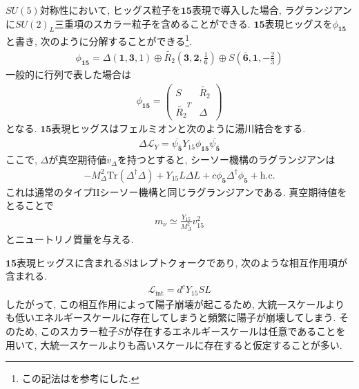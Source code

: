 $SU(5)$対称性において, ヒッグス粒子を$\bm{15}$表現で導入した場合, ラグランジアンに$SU(2)_L$三重項のスカラー粒子を含めることができる\cite{dorsner_phenomenological_2006,dorsner_unification_2005}.
$\bm{15}$表現ヒッグスを$\phi_{\bm{15}}$と書き, 次のように分解することができる\footnote{この記法は\cite{dorsnerPhysicsLeptoquarksPrecision2016}を参考にした.}.
\begin{align}
  \phi_{\bm{15}} = \Delta \left(\bm{1}, \bm{3}, 1\right) \oplus \widetilde{R_2}\left(\bm{3}, \bm{2},\frac{1}{6}\right)\oplus S\left(\overline{\bm{6}}, \bm{1}, -\frac{2}{3}\right)
\end{align}
一般的に行列で表した場合は
\begin{align}
  \phi_{\bm{15}} = \begin{pmatrix}
    S & {\widetilde{R_2}} \\
    \widetilde{R_2}^T & \Delta
  \end{pmatrix}
\end{align}
となる.
$\bm{15}$表現ヒッグスはフェルミオンと次のように湯川結合をする.
\begin{align}
  \Delta\mathcal{L}_Y = \overline{\psi_{\bm{\bar{5}}}} Y_{15} \phi_{\bm{15}}\overline{\psi_{\bm{\bar{5}}}} 
\end{align}
ここで, $\Delta$が真空期待値$v_\Delta$を持つとすると, シーソー機構のラグランジアンは
\begin{align}
  -M_\Delta^2 \mathrm{Tr}(\Delta^\dagger \Delta) + Y_{15} L\Delta L +c \phi_{\bm{5}}\Delta^\dagger \phi_{\bm{5}} +\mathrm{h.c.}\nonumber
\end{align}
これは通常のタイプIIシーソー機構と同じラグランジアンである.
真空期待値をとることで
\begin{align}
  m_\nu \simeq \frac{Y_{15}}{M_\Delta^2}v_{15}^2\nonumber
\end{align}
とニュートリノ質量を与える.

$\bm{15}$表現ヒッグスに含まれる$S$はレプトクォークであり, 次のような相互作用項が含まれる.
\begin{align}
  \mathcal{L}_{\mathrm{int}} = d^c Y_15 S L\nonumber
\end{align}
したがって, この相互作用によって陽子崩壊が起こるため, 大統一スケールよりも低いエネルギースケールに存在してしまうと頻繁に陽子が崩壊してしまう.
そのため, このスカラー粒子$S$が存在するエネルギースケールは任意であることを用いて, 大統一スケールよりも高いスケールに存在すると仮定することが多い.


